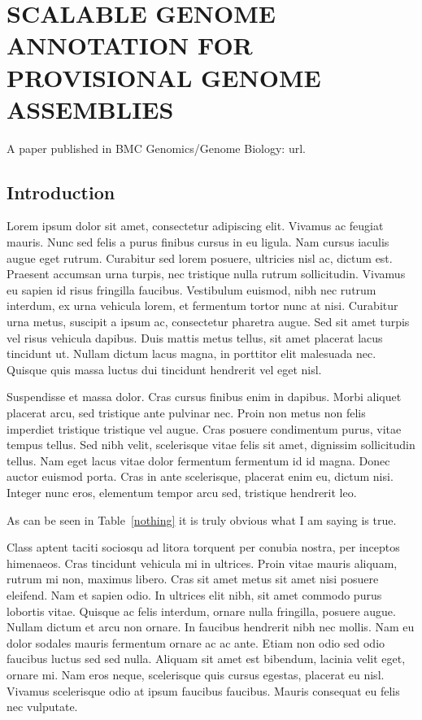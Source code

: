 \chapter{SCALABLE GENOME ANNOTATION FOR PROVISIONAL GENOME ASSEMBLIES}

A paper published in BMC Genomics/Genome Biology: url.

\section{Introduction}

Lorem ipsum dolor sit amet, consectetur adipiscing elit. Vivamus ac feugiat mauris. Nunc sed felis a purus finibus cursus in eu ligula. Nam cursus iaculis augue eget rutrum. Curabitur sed lorem posuere, ultricies nisl ac, dictum est. Praesent accumsan urna turpis, nec tristique nulla rutrum sollicitudin. Vivamus eu sapien id risus fringilla faucibus. Vestibulum euismod, nibh nec rutrum interdum, ex urna vehicula lorem, et fermentum tortor nunc at nisi. Curabitur urna metus, suscipit a ipsum ac, consectetur pharetra augue. Sed sit amet turpis vel risus vehicula dapibus. Duis mattis metus tellus, sit amet placerat lacus tincidunt ut. Nullam dictum lacus magna, in porttitor elit malesuada nec. Quisque quis massa luctus dui tincidunt hendrerit vel eget nisl.

Suspendisse et massa dolor. Cras cursus finibus enim in dapibus. Morbi aliquet placerat arcu, sed tristique ante pulvinar nec. Proin non metus non felis imperdiet tristique tristique vel augue. Cras posuere condimentum purus, vitae tempus tellus. Sed nibh velit, scelerisque vitae felis sit amet, dignissim sollicitudin tellus. Nam eget lacus vitae dolor fermentum fermentum id id magna. Donec auctor euismod porta. Cras in ante scelerisque, placerat enim eu, dictum nisi. Integer nunc eros, elementum tempor arcu sed, tristique hendrerit leo.

As can be seen in Table~\ref{nothing} it is truly obvious what I am saying is true.

\begin{table}[h!tb] \centering
{}
\label{nothing}
\vspace{ 2 in}
\end{table}

Class aptent taciti sociosqu ad litora torquent per conubia nostra, per inceptos himenaeos. Cras tincidunt vehicula mi in ultrices. Proin vitae mauris aliquam, rutrum mi non, maximus libero. Cras sit amet metus sit amet nisi posuere eleifend. Nam et sapien odio. In ultrices elit nibh, sit amet commodo purus lobortis vitae. Quisque ac felis interdum, ornare nulla fringilla, posuere augue. Nullam dictum et arcu non ornare. In faucibus hendrerit nibh nec mollis. Nam eu dolor sodales mauris fermentum ornare ac ac ante. Etiam non odio sed odio faucibus luctus sed sed nulla. Aliquam sit amet est bibendum, lacinia velit eget, ornare mi. Nam eros neque, scelerisque quis cursus egestas, placerat eu nisl. Vivamus scelerisque odio at ipsum faucibus faucibus. Mauris consequat eu felis nec vulputate.


